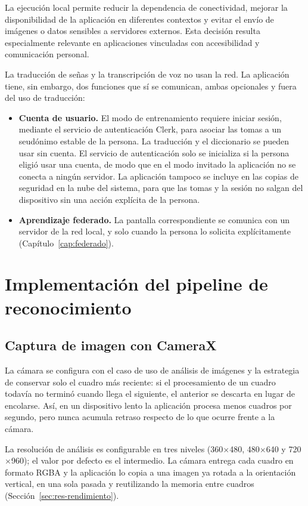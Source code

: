 La ejecución local permite reducir la dependencia de conectividad, mejorar la disponibilidad de la aplicación en diferentes contextos y evitar el envío de imágenes o datos sensibles a servidores externos. Esta decisión resulta especialmente relevante en aplicaciones vinculadas con accesibilidad y comunicación personal.

La traducción de señas y la transcripción de voz no usan la red. La aplicación tiene, sin embargo, dos funciones que sí se comunican, ambas opcionales y fuera del uso de traducción:

\begin{itemize}
    \item \textbf{Cuenta de usuario.} El modo de entrenamiento requiere iniciar sesión, mediante el servicio de autenticación Clerk, para asociar las tomas a un seudónimo estable de la persona. La traducción y el diccionario se pueden usar sin cuenta. El servicio de autenticación solo se inicializa si la persona eligió usar una cuenta, de modo que en el modo invitado la aplicación no se conecta a ningún servidor. La aplicación tampoco se incluye en las copias de seguridad en la nube del sistema, para que las tomas y la sesión no salgan del dispositivo sin una acción explícita de la persona.
    \item \textbf{Aprendizaje federado.} La pantalla correspondiente se comunica con un servidor de la red local, y solo cuando la persona lo solicita explícitamente (Capítulo~\ref{cap:federado}).
\end{itemize}

\section{Implementación del pipeline de reconocimiento}

\subsection{Captura de imagen con CameraX}

La cámara se configura con el caso de uso de análisis de imágenes y la estrategia de conservar solo el cuadro más reciente: si el procesamiento de un cuadro todavía no terminó cuando llega el siguiente, el anterior se descarta en lugar de encolarse. Así, en un dispositivo lento la aplicación procesa menos cuadros por segundo, pero nunca acumula retraso respecto de lo que ocurre frente a la cámara.

La resolución de análisis es configurable en tres niveles (360$\times$480, 480$\times$640 y 720$\times$960); el valor por defecto es el intermedio. La cámara entrega cada cuadro en formato RGBA y la aplicación lo copia a una imagen ya rotada a la orientación vertical, en una sola pasada y reutilizando la memoria entre cuadros (Sección~\ref{sec:res-rendimiento}).

